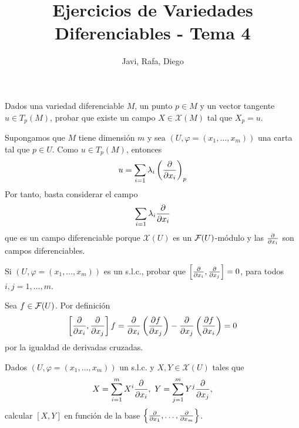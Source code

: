 \documentclass[twoside]{article}
\newcounter{ejercicio}
\begin{document}
\title{Ejercicios de Variedades Diferenciables - Tema 4}
\author{Javi, Rafa, Diego}
\maketitle

\begin{ejercicio}{1}
Dados una variedad diferenciable $M$, un punto $p\in M$ y un
vector tangente $u\in T_p(M)$, probar que existe un campo
$X\in\mathcal{X}(M)$ tal que $X_p=u$. 
\end{ejercicio}
\begin{solucion}
Supongamos que $M$ tiene dimensión $m$ y sea $(U,\varphi=(x_1,\dots,x_m))$ una carta tal que $p\in U$. Como $u\in T_p(M)$, entonces 
$$u=\sum_{i=1}\lambda_i\left(\frac{\partial }{\partial x_i}\right)_p$$
Por tanto, basta considerar el campo 
$$\sum_{i=1}\lambda_i\frac{\partial }{\partial x_i}$$
que es un campo diferenciable porque $\mathcal{X}(U)$ es un $\mathcal{F}(U)$-módulo y las $\frac{\partial }{\partial x_i}$ son campos diferenciables.
\end{solucion}

\newpage

\begin{ejercicio}{2}
Si $(U,\varphi=(x_1,\dots
,x_m))$ es un s.l.c., probar que
$\left[\frac{\partial }{\partial x_i},\frac{\partial }{\partial x_j}\right]=0$, para todos $i,j=1,\dots ,m$.
\end{ejercicio}
\begin{solucion}
Sea $f\in\mathcal{F}(U)$. Por definición 
$$\left[\frac{\partial }{\partial x_i},\frac{\partial }{\partial x_j}\right]f=\frac{\partial }{\partial x_i}\left(\frac{\partial f}{\partial x_j}\right)-\frac{\partial }{\partial x_j}\left(\frac{\partial f}{\partial x_i}\right)=0$$
por la igualdad de derivadas cruzadas. 
\end{solucion}

\newpage

\begin{ejercicio}{3}
Dados $(U,\varphi=(x_1,\dots ,x_m))$ un s.l.c. y
$X,Y\in\mathcal{X}(U)$ tales que
$$X=\sum_{i=1}^mX^i\frac{\partial }{\partial x_i},\mbox{ }Y=\sum_{j=1}^mY^j\frac{\partial }{\partial x_j},$$
calcular $[X,Y]$ en función de la base $\left\{\frac{\partial }{\partial x_1},\dots ,\frac{\partial }{\partial x_m}\right\}$.
\end{ejercicio}
\begin{solucion}
\end{solucion}
\end{document}
